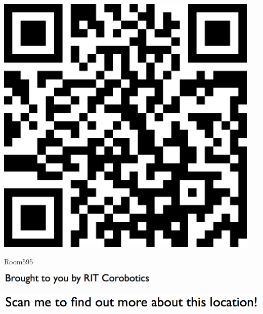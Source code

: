 \documentclass[letterpaper]{article}
\begin{document}
 \begingroup 
 \centerline{\includegraphics[scale=1,width=5in,height=5in]{Room595.png}} 
 \endgroup 
 \vspace*{\fill} 

 \hfill{\small Room595} 

  \vspace{0.7in} 
 
 \centerline{\includegraphics[scale=1,width=3in]{text-bottom.png}} 
 
 \pagebreak 
{} 
 \vspace*{\fill} 
 
  \centerline{\includegraphics[scale=1,width=6in]{text-top.png}} 
 
 \vspace{0.5in} 
 
\end{document}
